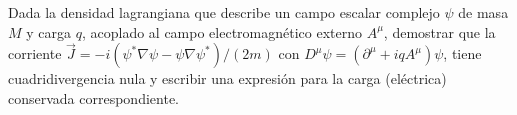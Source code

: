 Dada la densidad lagrangiana que describe un campo escalar complejo $\psi$ de masa $M$ y carga $q$, acoplado al campo electromagnético externo $A^\mu$, demostrar que la corriente $\vec{J}=-i\left(\psi^{*} \nabla \psi-\psi \nabla \psi^{*}\right) /(2 m)$ con $D^\mu \psi = (\partial^\mu + i q A^\mu)\psi$, tiene  cuadridivergencia  nula  y  escribir  una  expresión  para  la  carga  (eléctrica)  conservada correspondiente.

\begin{solution}\ \\

\end{solution}